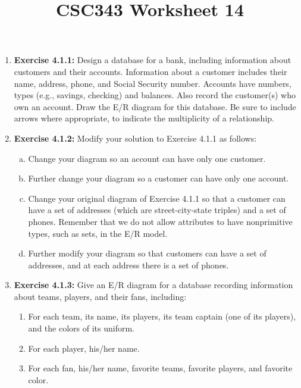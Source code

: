 \documentclass[12pt]{article}
\begin{document}
\title{CSC343 Worksheet 14}
\maketitle

\begin{enumerate}[1.]
    \item \textbf{Exercise 4.1.1:} Design a database for a bank, including information
    about customers and their accounts. Information about a customer includes their
    name, address, phone, and Social Security number. Accounts have numbers,
    types (e.g., savings, checking) and balances. Also record the customer(s) who
    own an account. Draw the E/R diagram for this database. Be sure to include
    arrows where appropriate, to indicate the multiplicity of a relationship.

    \item \textbf{Exercise 4.1.2:} Modify your solution to Exercise 4.1.1 as follows:

    \bigskip

    \begin{enumerate}[a)]
        \item Change your diagram so an account can have only one customer.
        \item Further change your diagram so a customer can have only one account.
        \item Change your original diagram of Exercise 4.1.1 so that a customer can have a set of addresses (which are street-city-state triples) and a set of phones. Remember that we do not allow attributes to have nonprimitive types, such as sets, in the E/R model.
        \item Further modify your diagram so that customers can have a set of addresses, and at each address there is a set of phones.
    \end{enumerate}

    \item \textbf{Exercise 4.1.3:} Give an E/R diagram for a database recording information
    about teams, players, and their fans, including:

    \begin{enumerate}[1.]
        \item For each team, its name, its players, its team captain (one of its players), and the colors of its uniform.
        \item For each player, his/her name.
        \item For each fan, his/her name, favorite teams, favorite players, and favorite color.
    \end{enumerate}


\end{enumerate}
\end{document}
